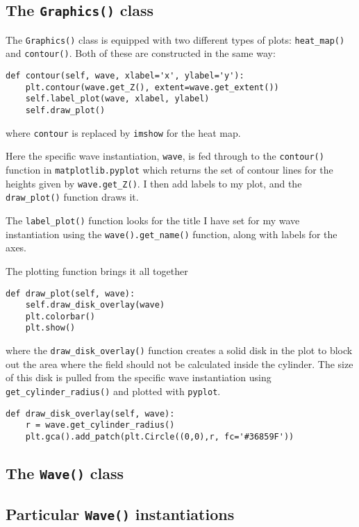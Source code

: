 \subsection{The \texttt{Graphics()} class}
%
The \verb!Graphics()! class is equipped with two different types of plots: \verb!heat_map()! and \verb!contour()!. Both of these are constructed in the same way:
%
  \begin{lstlisting}
def contour(self, wave, xlabel='x', ylabel='y'):
    plt.contour(wave.get_Z(), extent=wave.get_extent())
    self.label_plot(wave, xlabel, ylabel)
    self.draw_plot() \end{lstlisting}
%
where \verb!contour! is replaced by \verb!imshow! for the heat map. \par
%
Here the specific wave instantiation, \verb!wave!, is fed through to the \verb!contour()! function in \verb!matplotlib.pyplot! which returns the set of contour lines for the heights given by \verb!wave.get_Z()!. I then add labels to my plot, and the \verb!draw_plot()! function draws it. \par
%
The \verb!label_plot()! function looks for the title I have set for my wave instantiation using the \verb!wave().get_name()! function, along with labels for the axes. \par
%
The plotting function brings it all together
%
  \begin{lstlisting}
def draw_plot(self, wave):
    self.draw_disk_overlay(wave)
    plt.colorbar()
    plt.show()\end{lstlisting}
%
where the \verb!draw_disk_overlay()! function creates a solid disk in the plot to block out the area where the field should not be calculated inside the cylinder. The size of this disk is pulled from the specific wave instantiation using \verb!get_cylinder_radius()! and plotted with \verb!pyplot!.
%
\begin{lstlisting}
def draw_disk_overlay(self, wave):
    r = wave.get_cylinder_radius()
    plt.gca().add_patch(plt.Circle((0,0),r, fc='#36859F'))
\end{lstlisting}



\subsection{The \texttt{Wave()} class}
\subsection{Particular \texttt{Wave()} instantiations}


%
